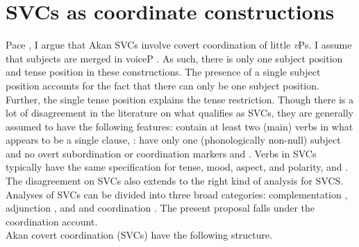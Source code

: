 \documentclass[output=paper,colorlinks,citecolor=brown]{langscibook}
\begin{document}
\section{SVCs as coordinate constructions}
Pace \citet{Martin2011}, I argue that Akan SVCs involve covert coordination of little \emph{v}Ps. I assume that subjects are merged in voiceP \citep{Kratzer1996}. As such, there is only one subject position and tense position in these constructions. The presence of a single subject position accounts for the fact that there can only be one subject position.  Further, the single tense position explains the tense restriction. Though there is a lot of disagreement in the literature on what qualifies as SVCs, they are generally assumed to have the following features: contain at least two (main) verbs in what appears to be a single clause, \citep{Veenstra1993}: have only one (phonologically non-null) subject and no overt subordination or coordination markers \citep{JansenEtAl1978} and \citep{Sebba1987}. Verbs in SVCs typically have the same specification for tense, mood, aspect, and polarity, \citep{Baker1989} and \citep{Collins1997}. The disagreement on SVCs also extends to the right kind of analysis for SVCS. Analyses of SVCs can be divided into three broad categories: complementation \citep{Baker1989, BakerStewart2002, Collins1997, Aboh2009}, adjunction \citep{BakerStewart2002}, and and coordination \citep{Agbedor1994}. The present proposal falls under the coordination account.\\
Akan covert coordination (SVCs) have the following structure.
\end{document}
